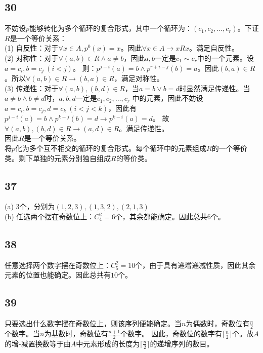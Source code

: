 \documentclass{article}
\begin{document}
\subsection{30}
不妨设$p$能够转化为多个循环的复合形式，其中一个循环为：$(c_1, c_2, \dots, c_r)$。下证$R$是一个等价关系：\\
(1) 自反性：对于$\forall x \in A, p^0(x) = x$。因此$\forall x \in A \rightarrow x R x$。满足自反性。\\
(2) 对称性：对于$\forall (a, b) \in R \land a \neq b$，因此$a, b$一定是$c_1 \sim c_r$中的一个元素。设$a = c_i, b = c_j\ (i < j)$。
则：$p^{j - i}(a) = b \land p^{r + i - j}(b) = a$。因此$(b, a) \in R$。所以$\forall (a, b) \in R \rightarrow (b, a) \in R$，满足对称性。\\
(3) 传递性：对于$\forall (a, b), (b, d) \in R$，当$ a = b \lor b = d$时显然满足传递性。当$a \neq b \land b \neq d$时，$a, b, d$一定是$c_1, c_2, \dots, c_r$
中的元素，因此不妨设$a = c_i, b = c_j, d = c_k\ (i < j < k)$，因此有$p^{j - i}(a) = b \land p^{k - j}(b) = d \rightarrow p^{k - i}(a) = d$。
故$\forall (a, b), (b, d) \in R \rightarrow (a, d) \in R$。满足传递性。\\
因此$R$是一个等价关系。\\
将$p$化为多个互不相交的循环的复合形式。每个循环中的元素组成$R$的一个等价类。剩下单独的元素分别独自组成$R$的等价类。
\subsection{37}
(a) $3$个，分别为$(1, 2, 3), (1, 3, 2), (2, 1, 3)$\\
(b) 任选两个摆在奇数位上：$C_4^2 = 6$个，其余都能确定。因此总共$6$个。
\subsection{38}
任意选择两个数字摆在奇数位上：$C_5^2 = 10$个，由于具有递增递减性质，因此其余元素的位置也能确定。因此总共有$10$个。
\subsection{39}
只要选出什么数字摆在奇数位上，则该序列便能确定。当$n$为偶数时，奇数位有$\frac{n}{2}$个数字。当$n$为基数时，奇数位有$\frac{n + 1}{2}$个数字。
因此，奇数位的数字有$\lceil \frac{n}{2} \rceil$个。故$A$的增-减置换数等于由$A$中元素形成的长度为$\lceil \frac{n}{2} \rceil$的递增序列的数目。
\end{document}
